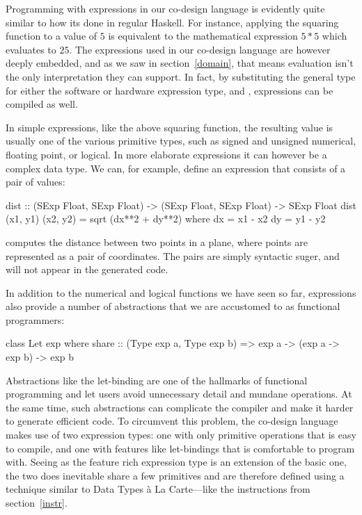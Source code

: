 \documentclass[../paper.tex]{subfiles}
\begin{document}

Programming with expressions in our co-design language is evidently quite similar to how its done in regular Haskell. For instance, applying the squaring function to a value of $5$ is equivalent to the mathematical expression $5*5$ which evaluates to $25$. The expressions used in our co-design language are however deeply embedded, and as we saw in section~\ref{domain}, that means evaluation isn't the only interpretation they can support. In fact, by substituting the general  type for either the software or hardware expression type,  and , expressions can be compiled as well.

In simple expressions, like the above squaring function, the resulting value is usually one of the various primitive types, such as signed and unsigned numerical, floating point, or logical. In more elaborate expressions it can however be a complex data type. We can, for example, define an expression that consists of a pair of values:

\begin{code}
dist :: (SExp Float, SExp Float) -> (SExp Float, SExp Float) -> SExp Float
dist (x1, y1) (x2, y2) = sqrt (dx**2 + dy**2)
  where
    dx = x1 - x2
    dy = y1 - y2
\end{code}

\noindent {} computes the distance between two points in a plane, where points are represented as a pair of coordinates. The pairs are simply syntactic suger, and will not appear in the generated code.

In addition to the numerical and logical functions we have seen so far, expressions also provide a number of abstractions that we are accustomed to as functional programmers:

\begin{code}
class Let exp where
  share :: (Type exp a, Type exp b) => exp a -> (exp a -> exp b) -> exp b
\end{code}

Abstractions like the let-binding are one of the hallmarks of functional programming and let users avoid unnecessary detail and mundane operations. At the same time, such abstractions can complicate the compiler and make it harder to generate efficient code. To circumvent this problem, the co-design language makes use of two expression types: one with only primitive operations that is easy to compile, and one with features like let-bindings that is comfortable to program with. Seeing as the feature rich expression type is an extension of the basic one, the two does inevitable share a few primitives and are therefore defined using a technique similar to Data Types \`{a} La Carte---like the instructions from section~\ref{instr}.
\end{document}
